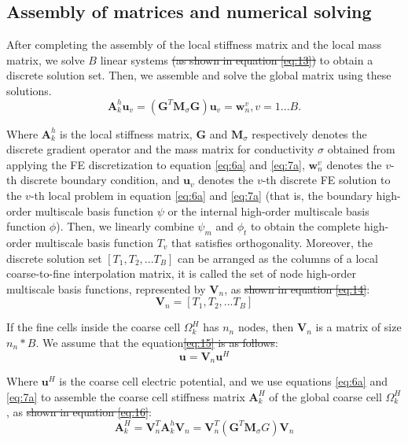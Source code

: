 \documentclass[manuscript,blind]{geophysics}
\providecommand{\DIFadd}[1]{{\protect\color{blue}\uwave{#1}}} %
\providecommand{\DIFdel}[1]{{\protect\color{red}\sout{#1}}}                      %
\providecommand{\DIFaddbegin}{} %
\providecommand{\DIFaddend}{} %
\providecommand{\DIFdelbegin}{} %
\providecommand{\DIFdelend}{} %
\newcommand{\DIFscaledelfig}{0.5}
\newlength{\DIFdelgraphicswidth} %
\newlength{\DIFdelgraphicsheight} %
\newcommand{\DIFaddincludegraphics}[2][]{{\color{blue}\fbox{\DIFOincludegraphics[#1]{#2}}}} %
\newcommand{\DIFdelincludegraphics}[2][]{%
\sbox{\DIFdelgraphicsbox}{\DIFOincludegraphics[#1]{#2}}%
\settoboxwidth{\DIFdelgraphicswidth}{\DIFdelgraphicsbox} %
\settoboxtotalheight{\DIFdelgraphicsheight}{\DIFdelgraphicsbox} %
\scalebox{\DIFscaledelfig}{%
\parbox[b]{\DIFdelgraphicswidth}{\usebox{\DIFdelgraphicsbox}\\[-\baselineskip] \rule{\DIFdelgraphicswidth}{0em}}\llap{\resizebox{\DIFdelgraphicswidth}{\DIFdelgraphicsheight}{%
\setlength{\unitlength}{\DIFdelgraphicswidth}%
\begin{picture}(1,1)%
\thicklines\linethickness{2pt} %
{\color[rgb]{1,0,0}\put(0,0){\framebox(1,1){}}}%
{\color[rgb]{1,0,0}\put(0,0){\line( 1,1){1}}}%
{\color[rgb]{1,0,0}\put(0,1){\line(1,-1){1}}}%
\end{picture}%
}\hspace*{3pt}}} %
} %
\DeclareRobustCommand{\DIFaddbegin}{\DIFOaddbegin \let\includegraphics\DIFaddincludegraphics} %
\DeclareRobustCommand{\DIFaddend}{\DIFOaddend \let\includegraphics\DIFOincludegraphics} %
\DeclareRobustCommand{\DIFdelbegin}{\DIFOdelbegin \let\includegraphics\DIFdelincludegraphics} %
\DeclareRobustCommand{\DIFdelend}{\DIFOaddend \let\includegraphics\DIFOincludegraphics} %
\begin{document}
\subsection{Assembly of matrices and numerical solving}
After completing the assembly of the local stiffness matrix and the local mass matrix, we solve $B$ linear systems  \DIFdelbegin \DIFdel{(as shown in equation \ref{eq:13}) }\DIFdelend to obtain a discrete solution set. Then, we assemble and solve the global matrix using these solutions.
\begin{equation}
  \label{eq:13}
     \mathbf{A}_k^h{\mathbf{u}_v} = ({\mathbf{G}^T}{\mathbf{M}_\sigma }\mathbf{G}){\mathbf{u}_v} = \mathbf{w}_n^v,v = 1...B .
\end{equation}

Where $\mathbf{A}_k^h$ is the local stiffness matrix, $\mathbf{G}$ and $\mathbf{M}_\sigma$ respectively denotes the discrete gradient operator and the mass matrix for conductivity $\sigma$ obtained from applying the FE discretization to equation \ref{eq:6a} and \ref{eq:7a}, $\mathbf{w}_n^v$ denotes the $v$-th discrete boundary condition, and $\mathbf{u}_v$ denotes the $v$-th discrete FE solution to the $v$-th local problem
in equation \ref{eq:6a} and \ref{eq:7a} (that is, the boundary high-order multiscale basis function $\psi$ or the internal high-order multiscale basis function $\phi$). Then, we linearly combine $\psi_m$ and $\phi_t$ to obtain the complete high-order multiscale basis function ${T}_v$ that satisfies orthogonality. Moreover, the discrete solution set $[{T}_1,{T}_2,...{T}_{B} ]$ can be arranged as the columns of a local coarse-to-fine interpolation matrix, it is called the set of node high-order multiscale basis functions, represented by $\mathbf{V}_n$, as \DIFdelbegin \DIFdel{shown in equation \ref{eq:14}}\DIFdelend \DIFaddbegin \DIFadd{follows}\DIFaddend :
\begin{equation}
  \label{eq:14}
     \mathbf{V}_n=[{T}_1,{T}_2,...{T}_B ]
\end{equation}

If the fine cells inside the coarse cell ${\Omega _k^H}$ has $n_n$ nodes, then $\mathbf{V}_n$ is a matrix of size $n_n*B$. We assume that the equation\DIFdelbegin \DIFdel{\ref{eq:15} is as follows}\DIFdelend :
\begin{equation}
  \label{eq:15}
     \mathbf{u} = {\mathbf{V}_n}{\mathbf{u}^H}
\end{equation}

Where $\mathbf{u}^H$ is the coarse cell electric potential, and we use equations \ref{eq:6a} and \ref{eq:7a} to assemble the coarse cell stiffness matrix $\mathbf{A}_k^H$ of the global coarse cell ${\Omega _k^H}$, as \DIFdelbegin \DIFdel{shown in equation \ref{eq:16}}\DIFdelend \DIFaddbegin \DIFadd{follows}\DIFaddend :
\begin{equation}
  \label{eq:16}
     \mathbf{A}_k^H = \mathbf{V}_n^T\mathbf{A}_k^h{\mathbf{V}_n} = \mathbf{V}_n^T({\mathbf{G}^T}{\mathbf{M}_\sigma }G){\mathbf{V}_n}
\end{equation}
\end{document}
